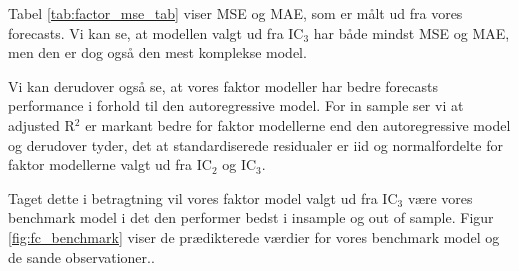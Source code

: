 Tabel \ref{tab:factor_mse_tab} viser MSE og MAE, som er målt ud fra vores forecasts. Vi kan se, at modellen valgt ud fra IC$_3$ har både mindst MSE og MAE, men den er dog også den mest komplekse model. 



Vi kan derudover også se, at vores faktor modeller har bedre forecasts performance i forhold til den autoregressive model. 
For in sample ser vi at adjusted R$^2$ er markant bedre for faktor modellerne end den autoregressive model og derudover tyder, det at standardiserede residualer er iid og normalfordelte for faktor modellerne valgt ud fra IC$_2$ og IC$_3$. 

Taget dette i betragtning vil vores faktor model valgt ud fra IC$_3$ være vores benchmark model i det den performer bedst i insample og out of sample. Figur \ref{fig:fc_benchmark} viser de prædikterede værdier for vores benchmark model og de sande observationer.. 




%
%
%
%






